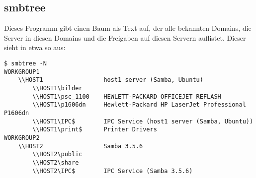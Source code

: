 \begin{normaltext}
  \subsection*{smbtree}
  Dieses Programm gibt einen Baum als Text auf, der alle bekannten Domains,
  die Server in diesen Domains und die Freigaben auf diesen Servern auflistet.
  Dieser sieht in etwa so aus:
  \begin{verbatim}
$ smbtree -N
WORKGROUP1
	\\HOST1         		host1 server (Samba, Ubuntu)
		\\HOST1\bilder         	
		\\HOST1\psc_1100    HEWLETT-PACKARD OFFICEJET REFLASH
		\\HOST1\p1606dn    	Hewlett-Packard HP LaserJet Professional P1606dn
		\\HOST1\IPC$       	IPC Service (host1 server (Samba, Ubuntu))
		\\HOST1\print$     	Printer Drivers
WORKGROUP2
	\\HOST2         		Samba 3.5.6
		\\HOST2\public         	
		\\HOST2\share          	
		\\HOST2\IPC$       	IPC Service (Samba 3.5.6)
  \end{verbatim}
\end{normaltext}

